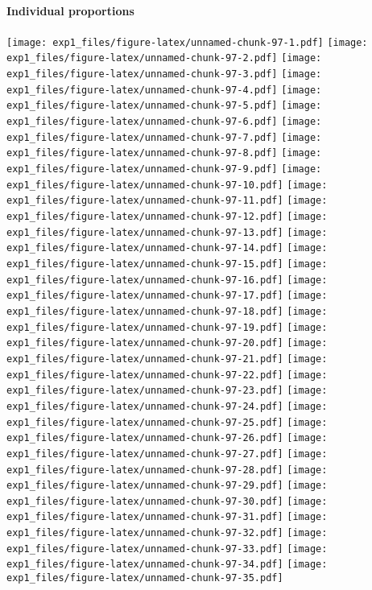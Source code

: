 \documentclass[,]{article}
\let\oldparagraph\paragraph
\renewcommand{\paragraph}[1]{\oldparagraph{#1}\mbox{}}
\begin{document}
\paragraph{Individual proportions}\label{individual-proportions}

\newpage

\texttt{[image: exp1\_files/figure-latex/unnamed-chunk-97-1.pdf]}
\texttt{[image: exp1\_files/figure-latex/unnamed-chunk-97-2.pdf]}
\texttt{[image: exp1\_files/figure-latex/unnamed-chunk-97-3.pdf]}
\texttt{[image: exp1\_files/figure-latex/unnamed-chunk-97-4.pdf]}
\texttt{[image: exp1\_files/figure-latex/unnamed-chunk-97-5.pdf]}
\texttt{[image: exp1\_files/figure-latex/unnamed-chunk-97-6.pdf]}
\texttt{[image: exp1\_files/figure-latex/unnamed-chunk-97-7.pdf]}
\texttt{[image: exp1\_files/figure-latex/unnamed-chunk-97-8.pdf]}
\texttt{[image: exp1\_files/figure-latex/unnamed-chunk-97-9.pdf]}
\texttt{[image: exp1\_files/figure-latex/unnamed-chunk-97-10.pdf]}
\texttt{[image: exp1\_files/figure-latex/unnamed-chunk-97-11.pdf]}
\texttt{[image: exp1\_files/figure-latex/unnamed-chunk-97-12.pdf]}
\texttt{[image: exp1\_files/figure-latex/unnamed-chunk-97-13.pdf]}
\texttt{[image: exp1\_files/figure-latex/unnamed-chunk-97-14.pdf]}
\texttt{[image: exp1\_files/figure-latex/unnamed-chunk-97-15.pdf]}
\texttt{[image: exp1\_files/figure-latex/unnamed-chunk-97-16.pdf]}
\texttt{[image: exp1\_files/figure-latex/unnamed-chunk-97-17.pdf]}
\texttt{[image: exp1\_files/figure-latex/unnamed-chunk-97-18.pdf]}
\texttt{[image: exp1\_files/figure-latex/unnamed-chunk-97-19.pdf]}
\texttt{[image: exp1\_files/figure-latex/unnamed-chunk-97-20.pdf]}
\texttt{[image: exp1\_files/figure-latex/unnamed-chunk-97-21.pdf]}
\texttt{[image: exp1\_files/figure-latex/unnamed-chunk-97-22.pdf]}
\texttt{[image: exp1\_files/figure-latex/unnamed-chunk-97-23.pdf]}
\texttt{[image: exp1\_files/figure-latex/unnamed-chunk-97-24.pdf]}
\texttt{[image: exp1\_files/figure-latex/unnamed-chunk-97-25.pdf]}
\texttt{[image: exp1\_files/figure-latex/unnamed-chunk-97-26.pdf]}
\texttt{[image: exp1\_files/figure-latex/unnamed-chunk-97-27.pdf]}
\texttt{[image: exp1\_files/figure-latex/unnamed-chunk-97-28.pdf]}
\texttt{[image: exp1\_files/figure-latex/unnamed-chunk-97-29.pdf]}
\texttt{[image: exp1\_files/figure-latex/unnamed-chunk-97-30.pdf]}
\texttt{[image: exp1\_files/figure-latex/unnamed-chunk-97-31.pdf]}
\texttt{[image: exp1\_files/figure-latex/unnamed-chunk-97-32.pdf]}
\texttt{[image: exp1\_files/figure-latex/unnamed-chunk-97-33.pdf]}
\texttt{[image: exp1\_files/figure-latex/unnamed-chunk-97-34.pdf]}
\texttt{[image: exp1\_files/figure-latex/unnamed-chunk-97-35.pdf]}
\end{document}
